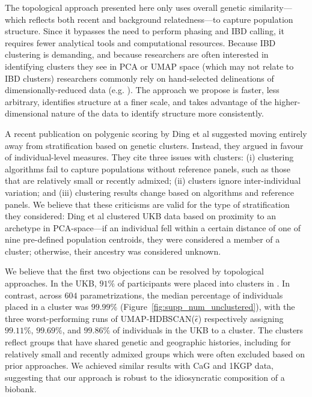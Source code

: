 The topological approach presented here only uses overall genetic similarity--- which reflects both recent and background relatedness---to capture population structure. Since it bypasses the need to perform phasing and IBD calling, it requires fewer analytical tools and computational resources. Because IBD clustering is demanding, and because researchers are often interested in identifying clusters they see in PCA or UMAP space (which may not relate to IBD clusters) researchers commonly rely on hand-selected delineations of dimensionally-reduced data (e.g. \citep{halldorsson_sequences_2022,sakaue_dimensionality_2020}). The approach we propose is faster, less arbitrary, identifies structure at a finer scale, and takes advantage of the higher-dimensional nature of the data to identify structure more consistently.

A recent publication on polygenic scoring by Ding et al\citep{ding_polygenic_2023} suggested moving entirely away from stratification based on genetic clusters. Instead, they argued in favour of individual-level measures. They cite three issues with clusters: (i) clustering algorithms fail to capture populations without reference panels, such as those that are relatively small or recently admixed; (ii) clusters ignore inter-individual variation; and (iii) clustering results change based on algorithms and reference panels. We believe that these criticisms are valid for the type of stratification they considered: Ding et al clustered UKB data based on proximity to an archetype in PCA-space---if an individual fell within a certain distance of one of nine pre-defined population centroids, they were considered a member of a cluster; otherwise, their ancestry was considered unknown.

We believe that the first two objections can be resolved by topological approaches. In the UKB, $91\%$ of participants were placed into clusters in \citep{ding_polygenic_2023}. In contrast, across $604$ parametrizations, the median percentage of individuals placed in a cluster was $99.99\%$ (Figure~\ref{fig:supp_num_unclustered}), with the three worst-performing runs of UMAP-HDBSCAN($\hat{\epsilon}$) respectively assigning $99.11\%$, $99.69\%$, and $99.86\%$  of individuals in the UKB to a cluster. The clusters reflect groups that have shared genetic and geographic histories, including for relatively small and recently admixed groups which were often excluded based on prior approaches\citep{ding_polygenic_2023,martschenko_including_2023}. 
We achieved similar results with CaG and 1KGP data, suggesting that our approach is robust to the idiosyncratic composition of a biobank.  


